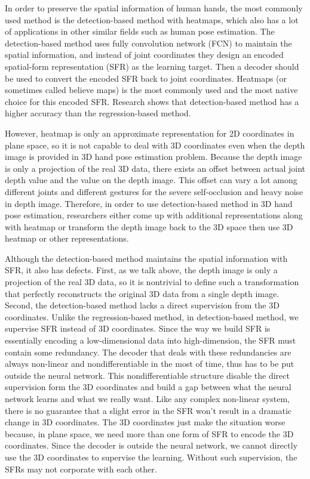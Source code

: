 \documentclass[journal]{IEEEtran}
\begin{document}
In order to preserve the spatial information of human hands, the most commonly used method is the detection-based method with heatmaps, 
which also has a lot of applications in other similar fields such as human pose estimation. 
The detection-based method uses fully convolution network (FCN) to maintain the spatial information, 
and instead of joint coordinates they design an encoded spatial-form representation (SFR) as the learning target. 
Then a decoder should be used to convert the encoded SFR back to joint coordinates. 
Heatmaps (or sometimes called believe maps\cite{wei2016convolutional}) is the most commonly used and the most native choice for this encoded SFR. 
Research\cite{yuan2018depth} shows that detection-based method has a higher accuracy than the regression-based method.

However, heatmap is only an approximate representation for 2D coordinates in plane space, 
so it is not capable to deal with 3D coordinates even when the depth image is provided in 3D hand pose estimation problem. 
Because the depth image is only a projection of the real 3D data, 
there exists an offset between actual joint depth value and the value on the depth image. 
This offset can vary a lot among different joints and different gestures for the severe self-occlusion and heavy noise in depth image. 
Therefore, in order to use detection-based method in 3D hand pose estimation, 
researchers either come up with additional representations along with heatmap or 
transform the depth image back to the 3D space then use 3D heatmap or other representations. 

Although the detection-based method maintains the spatial information with SFR, it also has defects. 
First, as we talk above, the depth image is only a projection of the real 3D data, 
so it is nontrivial to define such a transformation that perfectly reconstructs the original 3D data from a single depth image. 
Second, the detection-based method lacks a direct supervision from the 3D coordinates. 
Unlike the regression-based method, in detection-based method, we supervise SFR instead of 3D coordinates. 
Since the way we build SFR is essentially encoding a low-dimensional data into high-dimension, the SFR must contain some redundancy. 
The decoder that deals with these redundancies are always non-linear and nondifferentiable in the most of time, thus has to be put outside the neural network. 
This nondifferentiable structure disable the direct supervision form the 3D coordinates and 
build a gap between what the neural network learns and what we really want. 
Like any complex non-linear system, there is no guarantee that a slight error in the SFR won’t result in a dramatic change in 3D coordinates. 
The 3D coordinates just make the situation worse because, in plane space, we need more than one form of SFR to encode the 3D coordinates. 
Since the decoder is outside the neural network, we cannot directly use the 3D coordinates to supervise the learning. 
Without such supervision, the SFRs may not corporate with each other.
\end{document}
